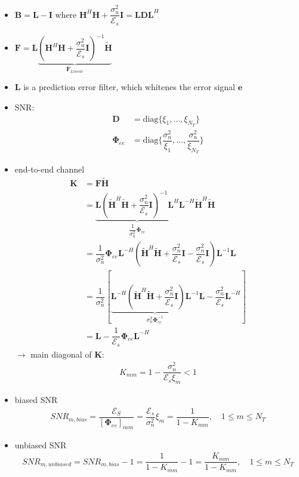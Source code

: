 \documentclass[a4paper, 10pt]{article}
\begin{document}
\begin{itemize}
	\begin{itemize}
		\item $\mathbf{B}=\mathbf{L}-\mathbf{I}$ where $\mathbf{H}^H\mathbf{H}+\dfrac{\sigma_n^2}{\mathcal{E}_s}\mathbf{I}=\mathbf{LDL}^H$
		\item $\mathbf{F}=\mathbf{L} \underbrace{(\mathbf{H}^H\mathbf{H}+\dfrac{\sigma_n^2}{\mathcal{E}_s}\mathbf{I})^{-1}\tilde{\mathbf{H}}}_{\mathbf{F}_{Linear}}$
		\item $\mathbf{L}$ is a prediction error filter, which whitenes the error signal $\mathbf{e}$
		\item SNR:
		\begin{align*}
			\mathbf{D}&=\mathrm{diag}\{\xi_1,\dots,\xi_{N_T}\}\\
			\boldsymbol{\Phi}_{ee}&=\mathrm{diag}\{\dfrac{\sigma_n^2}{\xi_1},\dots,\dfrac{\sigma_n^2}{\xi_{N_T}}\}
		\end{align*}
		\item end-to-end channel
		\begin{align*}
			\mathbf{K}&=\mathbf{F}\tilde{\mathbf{H}}\\
				&=\underbrace{\mathbf{L}(\tilde{\mathbf{H}}^H \tilde{\mathbf{H}}+ \dfrac{\sigma_n^2}{\mathcal{E}_s}\mathbf{I})^{-1}\mathbf{L}^H}_{\dfrac{1}{\sigma_n^2}\boldsymbol{\Phi}_{ee}} 
				\mathbf{L}^{-H} \tilde{\mathbf{H}}^H\tilde{\mathbf{H}}\\
				&= \dfrac{1}{\sigma_n^2} \boldsymbol{\Phi}_{ee} \mathbf{L}^{-H}(\tilde{\mathbf{H}}^H\tilde{\mathbf{H}}+\dfrac{\sigma_n^2}{\mathcal{E}_s}\mathbf{I}-\dfrac{\sigma_n^2}{\mathcal{E}_s}\mathbf{I})
				\mathbf{L}^{-1}\mathbf{L}\\
				&= \dfrac{1}{\sigma_n^2}[\underbrace{\mathbf{L}^{-H}(\tilde{\mathbf{H}}^H\tilde{\mathbf{H}}+\dfrac{\sigma_n^2}{\mathcal{E}_s}\mathbf{I})\mathbf{L}^{-1}}_{\sigma_n^2\boldsymbol{\Phi}_{ee}^{-1}}
				\mathbf{L}-\dfrac{\sigma_n^2}{\mathcal{E}_s}\mathbf{L}^{-H}]\\
				&=\mathbf{L}-\dfrac{1}{\mathcal{E}_s}\boldsymbol{\Phi}_{ee}\mathbf{L}^{-H}
		\end{align*}
		$\rightarrow$ main diagonal of $\mathbf{K}$:
		\begin{align*}
			K_{mm}=1-\dfrac{\sigma_n^2}{\mathcal{E}_s\xi_m} < 1
		\end{align*}
		\item biased SNR
		\begin{align*}
			SNR_{m,bias}=\dfrac{\mathcal{E}_S}{[\boldsymbol{\Phi}_{ee}]_{mm}}=\dfrac{\mathcal{E}_s}{\sigma_n^2}\xi_m=\dfrac{1}{1-K_{mm}}, \quad 1 \leq m \leq N_T
		\end{align*}
		\item unbiased SNR
		\begin{align*}
			SNR_{m,unbiased}=SNR_{m,bias}-1=\dfrac{1}{1-K_{mm}}-1=\dfrac{K_{mm}}{1-K_{mm}}, \quad 1 \leq m \leq N_T
		\end{align*}
	\end{itemize}
\end{itemize}
\end{document}
